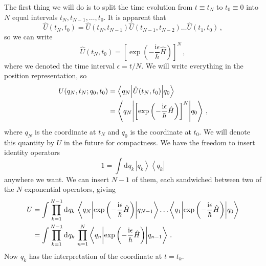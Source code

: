 \documentclass{article}
\theoremstyle{plain}\theoremheaderfont{\normalfont\itshape}\theorembodyfont{\rmfamily}\theoremseparator{.}\newtheorem*{rem}{Remark}\newtheorem*{ex}{Example}\newtheorem*{proof}{Proof}\newtheorem*{altp}{Alternative proof}
\theoremstyle{plain}\theoremheaderfont{\normalfont\bfseries}\theorembodyfont{\rmfamily}\theoremseparator{.}\newtheorem{thm}{Theorem}[section]\newtheorem{lem}[thm]{Lemma}\newtheorem{prop}[thm]{Proposition}\newtheorem*{cor}{Corollary}\newtheorem{defn}[thm]{Definition}\newtheorem{clm}[thm]{Claim}\newtheorem{clminproof}{Claim}
\theoremstyle{break}\theoremheaderfont{\normalfont\itshape}\theorembodyfont{\rmfamily}\theoremseparator{.\medskip}\newtheorem*{proofskip}{Proof}\newtheorem*{exs}{Examples}\newtheorem*{rems}{Remarks}
\theoremstyle{break}\theoremheaderfont{\normalfont\bfseries}\theorembodyfont{\rmfamily}\theoremseparator{.\medskip}\newtheorem{lemskip}[thm]{Lemma}\newtheorem{defnskip}[thm]{Definition}\newtheorem{propskip}[thm]{Proposition}\newtheorem{thmskip}[thm]{Theorem}
\numberwithin{equation}{section}
\newcommand{\ii}{\mathrm{i}}
\newcommand{\dd}[2][]{\mathrm{d}^{#1} #2\,}
\newcommand{\bra}[1]{\left\langle #1 \right|}
\newcommand{\ket}[1]{\left| #1 \right\rangle}
\newcommand{\mel}[3]{\left\langle #1 \middle| #2 \middle| #3 \right\rangle}
\begin{document}
    The first thing we will do is to split the time evolution from \(t\equiv t_N\) to \(t_0\equiv 0\) into \(N\) equal intervals \(t_N,t_{N-1},\dots,t_0\). It is apparent that
    \begin{equation}
        \hat{U}(t_N,t_0)=\hat{U}(t_N,t_{N-1})\hat{U}(t_{N-1},t_{N-2})\dots \hat{U}(t_1,t_0)\,,
    \end{equation}
    so we can write
    \begin{equation}
        \hat{U}(t_N,t_0)=\left[\exp\left(-\frac{\ii \epsilon}{\hbar}\hat{H}\right)\right]^N\,,
    \end{equation}
    where we denoted the time interval \(\epsilon=t/N\). We will write everything in the position representation, so
    \begin{align}
        U(q_N,t_N;q_0,t_0)&=\mel{q_N}{\hat{U}(t_N,t_0)}{q_0}\notag \\
        &=\mel{q_N}{\left[\exp\left(-\frac{\ii \epsilon}{\hbar}\hat{H}\right)\right]^N}{q_0}\,,
    \end{align}
    where \(q_N\) is the coordinate at \(t_N\) and \(q_0\) is the coordinate at \(t_0\). We will denote this quantity by \(U\) in the future for compactness. We have the freedom to insert identity operators
    \begin{equation}
        1=\int\dd{q_k}\ket{q_k}\bra{q_k}
    \end{equation}
    anywhere we want. We can insert \(N-1\) of them, each sandwiched between two of the \(N\) exponential operators, giving
    \begin{align}
        U&=\int\prod_{k=1}^{N-1}\dd{q_k} \mel{q_N}{\exp\left(-\frac{\ii \epsilon}{\hbar}\hat{H}\right)}{q_{N-1}}\dots\mel{q_1}{\exp\left(-\frac{\ii \epsilon}{\hbar}\hat{H}\right)}{q_0}\notag \\
        &=\int\prod_{k=1}^{N-1}\dd{q_k} \prod_{n=1}^{N}\mel{q_n}{\exp\left(-\frac{\ii \epsilon}{\hbar}\hat{H}\right)}{q_{n-1}}\,.
    \end{align}
    Now \(q_k\) has the interpretation of the coordinate at \(t=t_k\).
\end{document}
